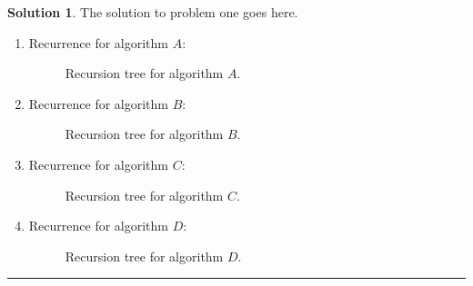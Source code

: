 \documentclass{article}
\theoremstyle{definition}
\def\fline{\rule{0.75\linewidth}{0.5pt}}
\newcommand{\finishline}{\vspace{-15pt}\begin{center}\fline\end{center}}
\newtheorem*{solution*}{Solution}
\newenvironment{solution}{\begin{solution*}}{{\finishline} \end{solution*}}
\begin{document}
\begin{solution}
	The solution to problem one goes here. 
	\begin{enumerate}[label=(\Alph*)]
		\item Recurrence for algorithm $A$:  
		

		\begin{figure}[h!]
			\centering
		\caption{Recursion tree for algorithm $A$.} 
		\end{figure}
		
		\item Recurrence for algorithm $B$:  
		
		\begin{figure}[h!]
			\centering
		\caption{Recursion tree for algorithm $B$.} 
		\end{figure}
		
		\item Recurrence for algorithm $C$:  
		
		\begin{figure}[h!]
			\centering
		\caption{Recursion tree for algorithm $C$.} 
		\end{figure}
		
		\item Recurrence for algorithm $D$:  
		
		\begin{figure}[h!]
			\centering
		\caption{Recursion tree for algorithm $D$.} 
		\end{figure}
		
	\end{enumerate}
\end{solution}
\smallskip
\end{document}
